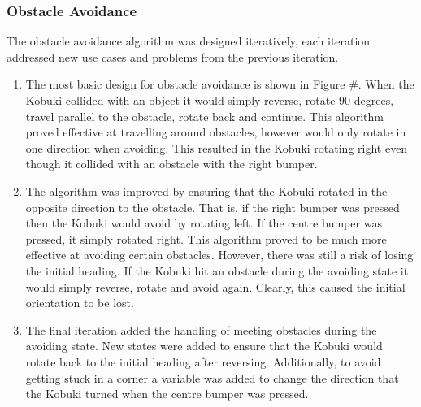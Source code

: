 \documentclass[11pt]{article}
\begin{document}
\subsubsection{Obstacle Avoidance}
The obstacle avoidance algorithm was designed iteratively, each iteration addressed new use cases and problems from the previous iteration.
\begin{enumerate}
    \item The most basic design for obstacle avoidance is shown in Figure \#. When the Kobuki collided with an object it would simply reverse, rotate 90 degrees, travel parallel to the obstacle, rotate back and continue. This algorithm proved effective at travelling around obstacles, however would only rotate in one direction when avoiding. This resulted in the Kobuki rotating right even though it collided with an obstacle with the right bumper.
    \item The algorithm was improved by ensuring that the Kobuki rotated in the opposite direction to the obstacle. That is, if the right bumper was pressed then the Kobuki would avoid by rotating left. If the centre bumper was pressed, it simply rotated right. This algorithm proved to be much more effective at avoiding certain obstacles. However, there was still a risk of losing the initial heading. If the Kobuki hit an obstacle during the avoiding state it would simply reverse, rotate and avoid again. Clearly, this caused the initial orientation to be lost.
    \item The final iteration added the handling of meeting obstacles during the avoiding state. New states were added to ensure that the Kobuki would rotate back to the initial heading after reversing. Additionally, to avoid getting stuck in a corner a variable was added to change the direction that the Kobuki turned when the centre bumper was pressed.
\end{enumerate}
\end{document}
